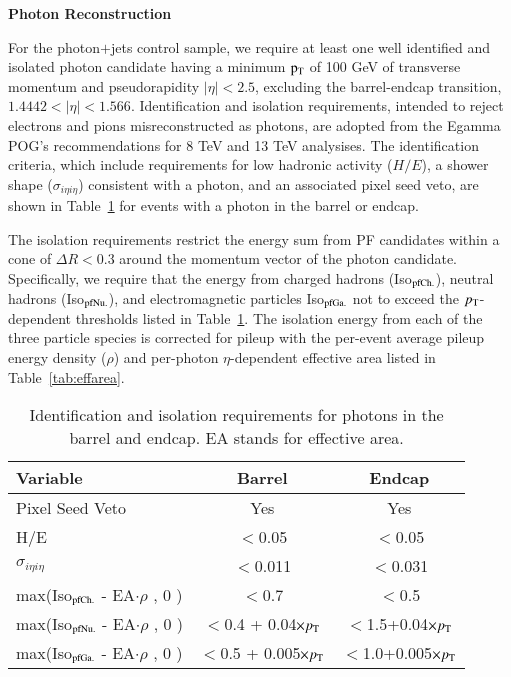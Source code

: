 {\bf Photon Reconstruction}

For the photon$+$jets control sample, we require at least one well identified and isolated photon candidate having a minimum $\rm p_{T}$ of 100 GeV of transverse momentum and pseudorapidity $|\eta|<2.5$, excluding the barrel-endcap transition, $1.4442<|\eta|<1.566$.  Identification and isolation requirements, intended to reject electrons and pions misreconstructed as photons, are adopted from the Egamma POG's recommendations for 8 TeV and 13 TeV analysises.  The identification criteria, which include requirements for low hadronic activity ($H/E$), a shower shape ($\sigma_{i\eta i\eta}$) consistent with a photon, and an associated pixel seed veto, are shown in Table~\ref{tab:IDISOcuts} for events with a photon in the barrel or endcap.

The isolation requirements restrict the energy sum from PF candidates within a cone of $\Delta R<0.3$ around the momentum vector of the photon candidate.  Specifically, we require that the energy from charged hadrons (Iso$_{\rm pfCh.}$), neutral hadrons (Iso$_{\rm pfNu.}$), and electromagnetic particles Iso$_{\rm pfGa.}$ not to exceed the $p_{\rm T}$-dependent thresholds listed in Table~\ref{tab:IDISOcuts}.  The isolation energy from each of the three particle species is corrected for pileup with the per-event average pileup energy density ($\rho$) and per-photon $\eta$-dependent effective area listed in Table~\ref{tab:effarea}.  


\begin{table}[h]
\begin{center}
\caption{Identification and isolation requirements for photons in the barrel and endcap. EA stands for effective area.}
\begin{tabular}{|l|c|c|}
\hline
Variable & Barrel & Endcap \\ 
\hline
Pixel Seed Veto & Yes & Yes \\
H/E & $<$0.05 & $<$0.05 \\
$\sigma_{i\eta i\eta}$ & $<$0.011 & $<$0.031 \\
\hline
max(Iso$_{\rm pfCh.}$ - EA$\cdot\rho$ , 0 ) & $<$0.7 & $<$0.5 \\
max(Iso$_{\rm pfNu.}$ - EA$\cdot\rho$ , 0 ) & $<$0.4 + 0.04$\times p_{\rm T}$ & $<$1.5+0.04$\times p_{\rm T}$ \\
max(Iso$_{\rm pfGa.}$ - EA$\cdot\rho$ , 0 ) & $<$0.5 + 0.005$\times p_{\rm T}$ & $<$1.0+0.005$\times p_{\rm T}$ \\
\hline
\end{tabular}
\label{tab:IDISOcuts} 
\end{center}
\end{table}

